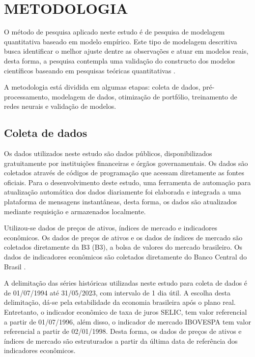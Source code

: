 \section{METODOLOGIA}
    
    \ipar O método de pesquisa aplicado neste estudo é de pesquisa de modelagem quantitativa baseado em modelo empírico. Este tipo de modelagem descritiva busca identificar o melhor ajuste dentre as observações e atuar em modelos reais, desta forma, a pesquisa contempla uma validação do constructo dos modelos científicos baseando em pesquisas teóricas quantitativas \cite{bertrand2002operations}.

    \ipar A metodologia está dividida em algumas etapas: coleta de dados, pré-processamento, modelagem de dados, otimização de portfólio, treinamento de redes neurais e validação de modelos.

    \subsection{Coleta de dados}

        \ipar Os dados utilizados neste estudo são dados públicos, disponibilizados gratuitamente por instituições financeiras e órgãos governamentais. Os dados são coletados através de códigos de programação que acessam diretamente as fontes oficiais. Para o desenvolvimento deste estudo, uma ferramenta de automação para atualização automática dos dados diariamente foi elaborada e integrada a uma plataforma de mensagens instantâneas, desta forma, os dados são atualizados mediante requisição e armazenados localmente.

        \ipar Utilizou-se dados de preços de ativos, índices de mercado e indicadores econômicos. Os dados de preços de ativos e os dados de índices de mercado são coletados diretamente da \acrshort{B3} (\acrlong{B3}), a bolsa de valores do mercado brasileiro. Os dados de indicadores econômicos são coletados diretamente do Banco Central do Brasil \cite{bcb2023selic}.
        
        \ipar A delimitação das séries históricas utilizadas neste estudo para coleta de dados é de 01/07/1994 até 31/05/2023, com intervalo de 1 dia útil. A escolha desta delimitação, dá-se pela estabilidade da economia brasileira após o plano real. Entretanto, o indicador econômico de taxa de juros SELIC, tem valor referencial a partir de 01/07/1996, além disso, o indicador de mercado \acrshort{IBOVESPA} tem valor referencial a partir de 02/01/1998. Desta forma, os dados de preços de ativos e índices de mercado são estruturados a partir da última data de referência dos indicadores econômicos.

